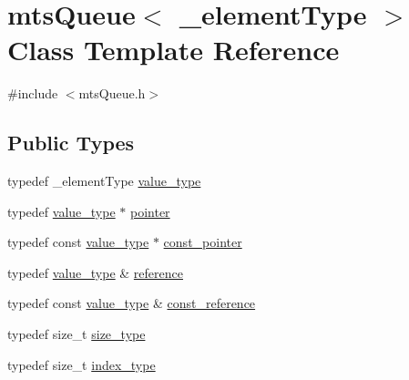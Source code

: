 \hypertarget{classmts_queue}{\section{mts\-Queue$<$ \-\_\-element\-Type $>$ Class Template Reference}
\label{classmts_queue}
}


{\ttfamily \#include $<$mts\-Queue.\-h$>$}

\subsection*{Public Types}
\begin{DoxyCompactItemize}
\item 
typedef \-\_\-element\-Type \hyperlink{classmts_queue_a041a2b244150e58247ee55039e0bb00f}{value\-\_\-type}
\item 
typedef \hyperlink{classmts_queue_a041a2b244150e58247ee55039e0bb00f}{value\-\_\-type} $\ast$ \hyperlink{classmts_queue_a66d423ede5c12e015a4e070e1bc23f43}{pointer}
\item 
typedef const \hyperlink{classmts_queue_a041a2b244150e58247ee55039e0bb00f}{value\-\_\-type} $\ast$ \hyperlink{classmts_queue_a1224d9a0146fab27bdb1db050288acb4}{const\-\_\-pointer}
\item 
typedef \hyperlink{classmts_queue_a041a2b244150e58247ee55039e0bb00f}{value\-\_\-type} \& \hyperlink{classmts_queue_ac59cdd255fe34f580085d58030887439}{reference}
\item 
typedef const \hyperlink{classmts_queue_a041a2b244150e58247ee55039e0bb00f}{value\-\_\-type} \& \hyperlink{classmts_queue_a3ae67f8b6cdb9686e5fca9ed1740290e}{const\-\_\-reference}
\item 
typedef size\-\_\-t \hyperlink{classmts_queue_a41b33537b89ae654421ba5e7c9893ed2}{size\-\_\-type}
\item 
typedef size\-\_\-t \hyperlink{classmts_queue_a2ddbc96d89691532f84001deeaa19ffe}{index\-\_\-type}
\end{DoxyCompactItemize}
